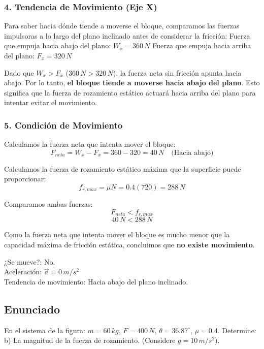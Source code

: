 \documentclass[12pt, a4paper]{article}
\begin{document}
\subsubsection*{4. Tendencia de Movimiento (Eje X)}
Para saber hacia dónde tiende a moverse el bloque, comparamos las fuerzas impulsoras a lo largo del plano inclinado antes de considerar la fricción:
Fuerza que empuja hacia abajo del plano: $W_x = 360 \, \si{N}$
Fuerza que empuja hacia arriba del plano: $F_x = 320 \, \si{N}$

Dado que $W_x > F_x$ ($360 \, \si{N} > 320 \, \si{N}$), la fuerza neta sin fricción apunta hacia abajo. Por lo tanto, \textbf{el bloque tiende a moverse hacia abajo del plano}. Esto significa que la fuerza de rozamiento estático actuará hacia arriba del plano para intentar evitar el movimiento.

\subsubsection*{5. Condición de Movimiento}
Calculamos la fuerza neta que intenta mover el bloque:
$$ F_{neta} = W_x - F_x = 360 - 320 = 40 \, \si{N} \quad \text{(Hacia abajo)} $$

Calculamos la fuerza de rozamiento estático máxima que la superficie puede proporcionar:
$$ f_{r,max} = \mu N = 0.4(720) = 288 \, \si{N} $$

Comparamos ambas fuerzas:
$$ F_{neta} < f_{r,max} $$
$$ 40 \, \si{N} < 288 \, \si{N} $$

Como la fuerza neta que intenta mover el bloque es mucho menor que la capacidad máxima de fricción estática, concluimos que \textbf{no existe movimiento}.

\begin{tcolorbox}[colback=green!5!white, colframe=green!50!black, title=Respuesta Final]
\centering
¿Se mueve?: No. \\
Aceleración: $\vec{a} = 0 \, \si{m/s^2}$ \\
Tendencia de movimiento: Hacia abajo del plano inclinado.
\end{tcolorbox}

\newpage

\subsection*{Enunciado}
En el sistema de la figura: $m = 60 \, \si{kg}$, $F = 400 \, \si{N}$, $\theta = 36.87^\circ$, $\mu = 0.4$. Determine:
b) La magnitud de la fuerza de rozamiento. (Considere $g = 10 \, \si{m/s^2}$).
\end{document}
